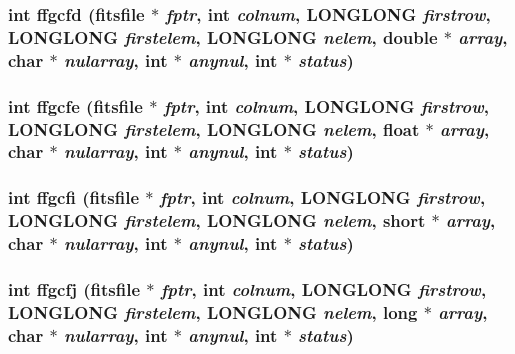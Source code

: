 \subsubsection{\setlength{\rightskip}{0pt plus 5cm}int ffgcfd (\bf{fitsfile} $\ast$ {\em fptr}, int {\em colnum}, \bf{LONGLONG} {\em firstrow}, \bf{LONGLONG} {\em firstelem}, \bf{LONGLONG} {\em nelem}, double $\ast$ {\em array}, char $\ast$ {\em nularray}, int $\ast$ {\em anynul}, int $\ast$ {\em status})}\label{src_2fitsio_8h_c923b88cae018d17ab73f2bea102040c}


\subsubsection{\setlength{\rightskip}{0pt plus 5cm}int ffgcfe (\bf{fitsfile} $\ast$ {\em fptr}, int {\em colnum}, \bf{LONGLONG} {\em firstrow}, \bf{LONGLONG} {\em firstelem}, \bf{LONGLONG} {\em nelem}, float $\ast$ {\em array}, char $\ast$ {\em nularray}, int $\ast$ {\em anynul}, int $\ast$ {\em status})}\label{src_2fitsio_8h_0a51c7fe5f433a8dc1921f6bbaa80ba6}


\subsubsection{\setlength{\rightskip}{0pt plus 5cm}int ffgcfi (\bf{fitsfile} $\ast$ {\em fptr}, int {\em colnum}, \bf{LONGLONG} {\em firstrow}, \bf{LONGLONG} {\em firstelem}, \bf{LONGLONG} {\em nelem}, short $\ast$ {\em array}, char $\ast$ {\em nularray}, int $\ast$ {\em anynul}, int $\ast$ {\em status})}\label{src_2fitsio_8h_774ed3067f67eae5acf7e32216e80463}


\subsubsection{\setlength{\rightskip}{0pt plus 5cm}int ffgcfj (\bf{fitsfile} $\ast$ {\em fptr}, int {\em colnum}, \bf{LONGLONG} {\em firstrow}, \bf{LONGLONG} {\em firstelem}, \bf{LONGLONG} {\em nelem}, long $\ast$ {\em array}, char $\ast$ {\em nularray}, int $\ast$ {\em anynul}, int $\ast$ {\em status})}\label{src_2fitsio_8h_18100300f5980a77bbc67d1ecc0d2708}


